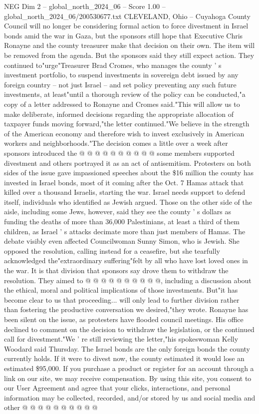 \begin{textsample}{NEG Dim 2 – global\_north\_2024\_06 – Score 1.00 – global\_north\_2024\_06/200530677.txt}  \label{ex:f2_neg_130}
CLEVELAND, Ohio -- Cuyahoga County Council will no longer be considering formal action to force divestment in Israel bonds amid the war in Gaza, but the sponsors still hope that Executive Chris Ronayne and the county treasurer make that decision on their own.
The item will be removed from the agenda.
But the sponsors said they still expect action.
They continued to"urge"Treasurer Brad Cromes, who manages the county ' s investment portfolio, to suspend investments in sovereign debt issued by any foreign country -- not just Israel -- and set policy preventing any such future investments, at least"until a thorough review of the policy can be conducted,"a copy of a letter addressed to Ronayne and Cromes said."This will allow us to make deliberate, informed decisions regarding the appropriate allocation of taxpayer funds moving forward,"the letter continued."We believe in the strength of the American economy and therefore wish to invest exclusively in American workers and neighborhoods."The decision comes a little over a week after sponsors introduced the @ @ @ @ @ @ @ @ @ @ some members supported divestment and others portrayed it as an act of antisemitism.
Protesters on both sides of the issue gave impassioned speeches about the \$16 million the county has invested in Israel bonds, most of it coming after the Oct. 7 Hamas attack that killed over a thousand Israelis, starting the war.
Israel needs support to defend itself, individuals who identified as Jewish argued.
Those on the other side of the aisle, including some Jews, however, said they see the county ' s dollars as funding the deaths of more than 36,000 Palestinians, at least a third of them children, as Israel ' s attacks decimate more than just members of Hamas.
The debate visibly even affected Councilwoman Sunny Simon, who is Jewish.
She opposed the resolution, calling instead for a ceasefire, but she tearfully acknowledged the"extraordinary suffering"felt by all who have lost loved ones in the war.
It is that division that sponsors say drove them to withdraw the resolution.
They aimed to @ @ @ @ @ @ @ @ @ @, including a discussion about the ethical, moral and political implications of those investments.
But"it has become clear to us that proceeding... will only lead to further division rather than fostering the productive conversation we desired,"they wrote.
Ronayne has been silent on the issue, as protesters have flooded council meetings.
His office declined to comment on the decision to withdraw the legislation, or the continued call for divestment."We ' re still reviewing the letter,"his spokeswoman Kelly Woodard said Thursday.
The Israel bonds are the only foreign bonds the county currently holds.
If it were to divest now, the county estimated it would lose an estimated \$95,000.
If you purchase a product or register for an account through a link on our site, we may receive compensation.
By using this site, you consent to our User Agreement and agree that your clicks, interactions, and personal information may be collected, recorded, and/or stored by us and social media and other @ @ @ @ @ @ @ @ @ @

\end{textsample}
